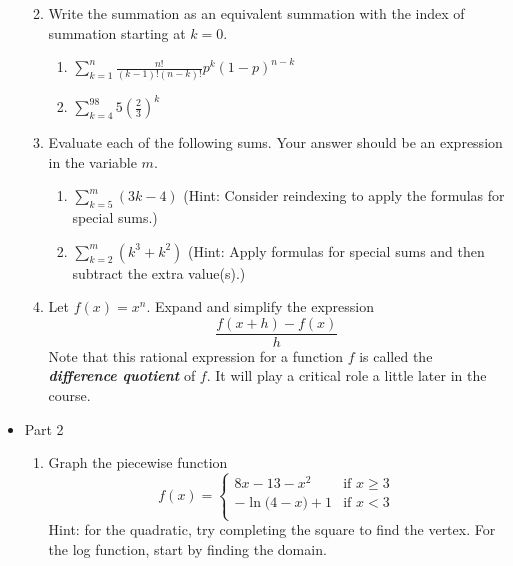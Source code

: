 \documentclass{article}
\begin{document}
\begin{itemize}
\begin{enumerate}
\begin{enumerate}
                            \end{enumerate}
                        \item Write the summation as an equivalent summation with the index of summation starting at $k=0$.
                            \begin{enumerate}
                                \item $\displaystyle \sum_{k=1}^n \frac{n!}{(k-1)!(n-k)!}p^k(1-p)^{n-k}$
                                \item $\displaystyle \sum_{k=4}^{98} 5\left(\frac{2}{3}\right) ^k$
                            \end{enumerate}
                        \item Evaluate each of the following sums.  Your answer should be an expression in the variable $m$.
                            \begin{enumerate}
                                \item $\displaystyle \sum_{k=5}^{m} (3k-4)$  (Hint: Consider reindexing to apply the formulas for special sums.)
                                \item $\displaystyle \sum_{k=2}^{m} (k^3+k^2)$  (Hint: Apply formulas for special sums and then subtract the extra value(s).)
                            \end{enumerate}
                        \item Let $f(x) = x^n$. Expand and simplify the expression $$\frac{f(x+h)-f(x)}{h}$$  Note that this rational expression for a function $f$ is called the \textbf{\em difference quotient} of $f$.  It will play a critical role a little later in the course.
                    \end{enumerate}
                \item Part 2
                    \begin{enumerate}
                        \item Graph the piecewise function	     $$f(x) =  \begin{cases} 
                            8x-13-x^2 & \text{if $x \geq 3$} \\
                            -\ln{(4-x}) + 1 & \text{if $x < 3$} \\
                            \end{cases}$$
                            Hint: for the quadratic, try completing the square to find the vertex. For the log function, start by finding the domain.

\end{enumerate}
\end{itemize}
\end{document}
